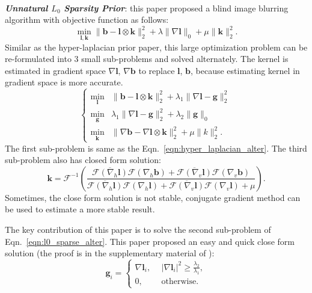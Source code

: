 \documentclass[journal, onecolumn, 10pt]{IEEEtran}
\begin{document}
~\\
\textbf{\emph{Unnatural $L_0$ Sparsity Prior}}\cite{xu2013unnatural}: this paper proposed a blind image blurring algorithm with objective function as follows:
\begin{equation}
\min_{\mathbf{l}, \mathbf{k}} \| \mathbf{b} - \mathbf{l} \otimes \mathbf{k} \|_2^2 + \lambda \|\nabla \mathbf{l} \|_0 + \mu \| \mathbf{k} \|_2^2.
\label{eqn:l0_sparse}
\end{equation}
Similar as the hyper-laplacian prior paper, this large optimization problem can be re-formulated into 3 small sub-problems and solved alternately. The kernel is estimated in gradient space $\nabla\mathbf{l}$, $\nabla\mathbf{b}$ to replace $\mathbf{l}$, $\mathbf{b}$, because estimating kernel in gradient space is more accurate\cite{cho2009fast}.
\begin{equation}
\begin{cases}
\min_{\mathbf{l}} &\| \mathbf{b} - \mathbf{l} \otimes \mathbf{k} \|_2^2 + \lambda_1 \|\nabla \mathbf{l} - \mathbf{g}\|_2^2 \\
\min_{\mathbf{g}} &\lambda_1\|\nabla \mathbf{l} - \mathbf{g}\|_2^2 + \lambda_2\|\mathbf{g}\|_{0} \\
\min_{\mathbf{k}} &\| \nabla\mathbf{b} - \nabla\mathbf{l} \otimes \mathbf{k} \|_2^2 + \mu \|k\|_2^2.
\end{cases}
\label{eqn:l0_sparse_alter}
\end{equation}
The first sub-problem is same as the Eqn.~\ref{eqn:hyper_laplacian_alter}. The third sub-problem also has closed form solution:
\begin{equation}
\mathbf{k} = \mathcal{F}^{-1} \left( \frac{\overline{\mathcal{F}(\nabla_h\mathbf{l})}\mathcal{F}(\nabla_h\mathbf{b}) + 
\overline{\mathcal{F}(\nabla_v\mathbf{l})}\mathcal{F}(\nabla_v\mathbf{b})}
{\overline{\mathcal{F}(\nabla_h\mathbf{l})}\mathcal{F}(\nabla_h\mathbf{l}) + 
\overline{\mathcal{F}(\nabla_v\mathbf{l})}\mathcal{F}(\nabla_v\mathbf{l}) + \mu} \right).
\label{eqn:l2_kernel_close_form}
\end{equation}
Sometimes, the close form solution is not stable, conjugate gradient method can be used to estimate a more stable result.

The key contribution of this paper is to solve the second sub-problem of Eqn.~\ref{eqn:l0_sparse_alter}. This paper proposed an easy and quick close form solution (the proof is in the supplementary material of \cite{xu2013unnatural}):
\begin{equation}
\mathbf{g}_i = 
\begin{cases}
\nabla\mathbf{l}_i, &~~ |\nabla\mathbf{l}_i|^2 \geqslant \frac{\lambda_2}{\lambda_1}, \\
0, &~~ \text{otherwise}.
\end{cases}
\end{equation}
\end{document}
